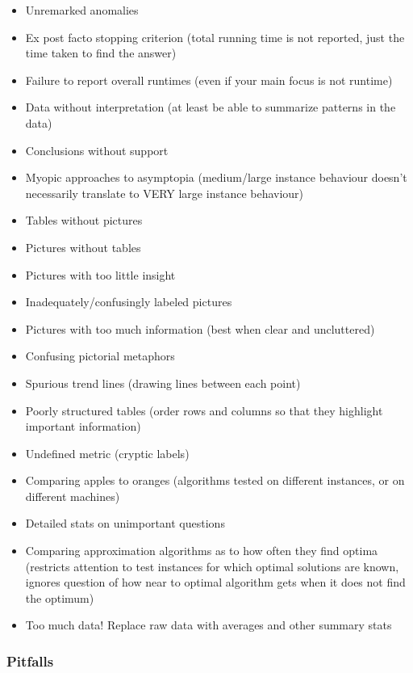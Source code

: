 \begin{itemize}
    \item Unremarked anomalies
    \item Ex post facto stopping criterion (total running time is not reported, just the time taken to find the answer)
    \item Failure to report overall runtimes (even if your main focus is not runtime)
    \item Data without interpretation (at least be able to summarize patterns in the data)
    \item Conclusions without support
    \item Myopic approaches to asymptopia (medium/large instance behaviour doesn't necessarily translate to VERY large instance behaviour)
    \item Tables without pictures
    \item Pictures without tables
    \item Pictures with too little insight
    \item Inadequately/confusingly labeled pictures
    \item Pictures with too much information (best when clear and uncluttered)
    \item Confusing pictorial metaphors
    \item Spurious trend lines (drawing lines between each point)
    \item Poorly structured tables (order rows and columns so that they highlight important information)
    \item Undefined metric (cryptic labels)
    \item Comparing apples to oranges (algorithms tested on different instances, or on different machines)
    \item Detailed stats on unimportant questions
    \item Comparing approximation algorithms as to how often they find optima (restricts attention to test instances for which optimal solutions are known, ignores question of how near to optimal algorithm gets when it does not find the optimum)
    \item Too much data! Replace raw data with averages and other summary stats
\end{itemize}

\subsubsection{Pitfalls}

